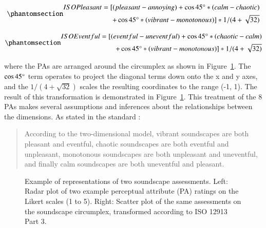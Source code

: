\documentclass[
  authoryear,
  preprint,
  3p]{elsarticle}
\begin{document}
\begin{equation}\phantomsection\label{eq-pleasant}{
\begin{split}
    ISO Pleasant = [(pleasant - annoying) + \cos 45\degree * (calm - chaotic) \\ + \cos 45\degree * (vibrant - monotonous)] * 1/(4+\sqrt{32)}
\end{split}
}\end{equation}

\begin{equation}\phantomsection\label{eq-eventful}{
\begin{split}
    ISO Eventful = [(eventful - uneventful) + \cos 45\degree * (chaotic - calm) \\ + \cos 45\degree * (vibrant - monotonous)] * 1/(4+\sqrt{32)}
\end{split}
}\end{equation}

where the PAs are arranged around the circumplex as shown in
Figure~\ref{fig-radar}. The \(\cos 45\degree\) term operates to project
the diagonal terms down onto the x and y axes, and the
\(1 / (4 + \sqrt{32})\) scales the resulting coordinates to the range
(-1, 1). The result of this transformation is demonstrated in
Figure~\ref{fig-radar}. This treatment of the 8 PAs makes several
assumptions and inferences about the relationships between the
dimensions. As stated in the standard \citep[5]{ISO12913_3}:

\begin{quote}
According to the two-dimensional model, vibrant soundscapes are both
pleasant and eventful, chaotic soundscapes are both eventful and
unpleasant, monotonous soundscapes are both unpleasant and uneventful,
and finally calm soundscapes are both uneventful and pleasant.
\end{quote}

\begin{figure}


\caption{\label{fig-radar}Example of representations of two soundscape
assessments. Left: Radar plot of two example perceptual attribute (PA)
ratings on the Likert scales (1 to 5). Right: Scatter plot of the same
assessments on the soundscape circumplex, transformed according to ISO
12913 Part 3.}

\end{figure}%
\end{document}
